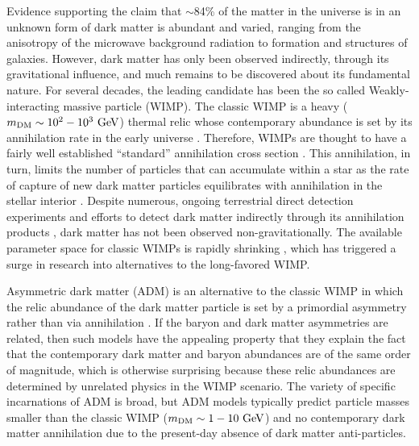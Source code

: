 \documentclass[useAMS,usenatbib]{mnras}
\begin{document}
  Evidence supporting the claim that $\sim$84\% of the matter in the universe is in
  an unknown form of dark matter is abundant and varied, ranging from the
  anisotropy of the microwave background radiation to formation and structures of galaxies.
  However, dark matter has only been observed indirectly, through its
  gravitational influence, and much remains to be discovered about its fundamental nature.
  For several decades, the leading candidate has been the so called Weakly-interacting massive particle (WIMP).
  The classic WIMP is a heavy ($m_{\mathrm{DM}} \sim 10^2-10^3 \ \mathrm{GeV}$) thermal relic whose contemporary abundance is set
  by its annihilation rate in the early universe .
  Therefore, WIMPs are thought to have a fairly well established ``standard'' annihilation
  cross section \citep[e.g.,][]{steigman_etal12}. This annihilation, in turn, limits the number of particles
  that can accumulate within a star as the rate of capture of new dark matter particles
  equilibrates with annihilation in the stellar interior \citep{krauss_etal85}.
  Despite numerous, ongoing terrestrial direct detection experiments  and
  efforts to detect dark matter indirectly through its annihilation products ,
  dark matter has not been observed non-gravitationally. The
  available parameter space for classic WIMPs is rapidly shrinking
  \citep{Amole16} ,
  which has triggered a surge in research into alternatives to the long-favored WIMP.


  Asymmetric dark matter (ADM) is an alternative to the classic WIMP in which
  the relic abundance of the dark matter particle is set by a primordial asymmetry
  rather than via annihilation \citep[for a review, see][and references therein]{adm_review}.
  If the baryon and dark matter asymmetries are
  related, then such models have the appealing property that they explain
  the fact that the contemporary dark matter and baryon abundances are
  of the same order of magnitude, which is otherwise surprising because
  these relic abundances are determined by unrelated physics in the WIMP
  scenario. The variety of specific incarnations of ADM is broad,
  but ADM models typically predict particle masses smaller than
  the classic WIMP ($m_{\mathrm{DM}} \sim 1-10 \ \mathrm{GeV}$) and no contemporary
  dark matter annihilation due to the present-day absence of
  dark matter anti-particles.
\end{document}
